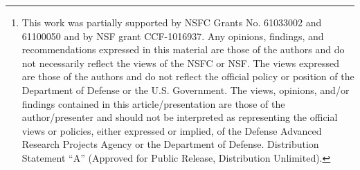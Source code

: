 \begin{abstract}
An ad hoc data source is any semi-structured, non-standard data source.  
The format of such data sources is often evolving and frequently 
lacking documentation.
Consequently, off-the-shelf tools for processing such data often
do not exist, forcing analysts to develop their own tools, a
costly and time-consuming process.
In this paper, we present an incremental algorithm that automatically
infers the format of large-scale data sources. From the resulting format
descriptions, we can generate a suite of data processing tools
automatically. The system can handle large-scale or streaming 
data sources whose formats evolve over time.  
Furthermore, it allows analysts to modify inferred
descriptions as desired and incorporates those changes in 
future revisions.
\footnote{
This work was partially supported by NSFC Grants No. 61033002 and 61100050
and by NSF grant CCF-1016937. Any opinions, findings, and recommendations
expressed in this material are those of the authors and do not
necessarily reflect the views of the NSFC or NSF.
The views expressed are those of the authors and do not reflect the official policy or position of the Department of Defense or the U.S. Government.  The views, opinions, and/or findings contained in this article/presentation are those of the author/presenter and should not be interpreted as representing the official views or policies, either expressed or implied, of the Defense Advanced Research Projects Agency or the Department of Defense.   Distribution Statement ``A'' (Approved for Public Release, Distribution Unlimited).
}
\end{abstract}
